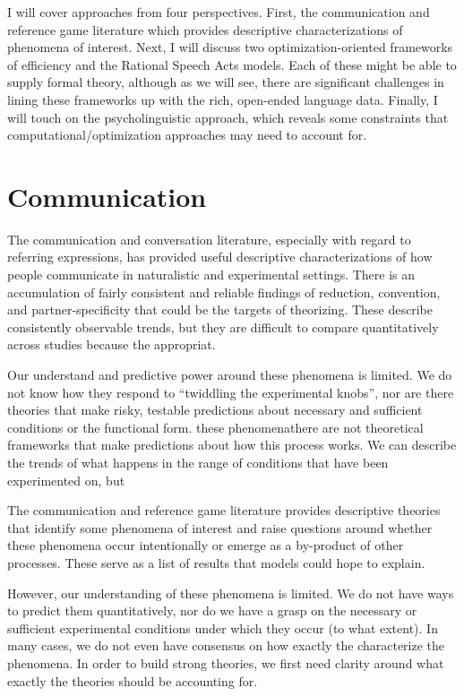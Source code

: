 \documentclass[]{article}
\begin{document}
	I will cover approaches from four perspectives. First, the communication and reference game literature which provides descriptive characterizations of phenomena of interest. Next, I will discuss two optimization-oriented frameworks of efficiency and the Rational Speech Acts models. Each of these might be able to supply formal theory, although as we will see, there are significant challenges in lining these frameworks up with the rich, open-ended language data. Finally, I will touch on the psycholinguistic approach, which reveals some constraints that computational/optimization approaches may need to account for. 
	


\section{Communication}



The communication and conversation literature, especially with regard to referring expressions, has provided useful descriptive characterizations of how people communicate in naturalistic and experimental settings. There is an accumulation of fairly consistent and reliable findings of reduction, convention, and partner-specificity that could be the targets of theorizing. These describe consistently observable trends, but they are difficult to compare quantitatively across studies because the appropriat. 

Our understand and predictive power around these phenomena is limited. We do not know how they respond to ``twiddling the experimental knobs'', nor are there theories that make risky, testable predictions about necessary and sufficient conditions or the functional form.  these phenomenathere are not theoretical frameworks that make predictions about how this process works. We can describe the trends of what happens in the range of conditions that have been experimented on, but %

The communication and reference game literature provides descriptive theories that identify some phenomena of interest and raise questions around whether these phenomena occur intentionally or emerge as a by-product of other processes. These serve as a list of results that models could hope to explain. 

However, our understanding of these phenomena is limited. We do not have ways to predict them quantitatively, nor do we have a grasp on the necessary or sufficient experimental conditions under which they occur (to what extent). In many cases, we do not even have consensus on how exactly the characterize the phenomena. In order to build strong theories, we first need clarity around what exactly the theories should be accounting for. 
\end{document}
